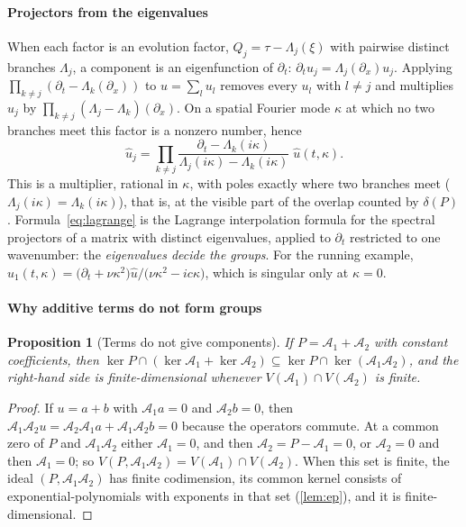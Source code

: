 \documentclass[11pt]{article}
\theoremstyle{plain}
\newtheorem{proposition}[theorem]{Proposition}
\theoremstyle{definition}
\theoremstyle{remark}
\newcommand{\Var}{V}                        %
\newcommand{\deltaP}{\delta(P)}             %
\begin{document}
\paragraph{Projectors from the eigenvalues}
When each factor is an evolution factor, $Q_j=\tau-\Lambda_j(\xi)$ with pairwise distinct branches
$\Lambda_j$, a component is an eigenfunction of $\partial_t$: $\partial_tu_j=\Lambda_j(\partial_x)u_j$. Applying
$\prod_{k\ne j}(\partial_t-\Lambda_k(\partial_x))$ to $u=\sum_lu_l$ removes every $u_l$ with $l\ne j$ and multiplies $u_j$ by $\prod_{k\ne j}(\Lambda_j-\Lambda_k)(\partial_x)$.
On a spatial Fourier mode $\kappa$ at which no two branches meet this factor is a nonzero number, hence
\begin{equation}\label{eq:lagrange}
  \hat u_j=\prod_{k\ne j}\frac{\partial_t-\Lambda_k(i\kappa)}{\Lambda_j(i\kappa)-\Lambda_k(i\kappa)}\;\hat u(t,\kappa) .
\end{equation}
This is a multiplier, rational in $\kappa$, with poles exactly where two branches
meet ($\Lambda_j(i\kappa)=\Lambda_k(i\kappa)$), that is, at the visible part of the overlap counted by $\deltaP$.
Formula~\eqref{eq:lagrange} is the Lagrange interpolation formula for the spectral projectors of a
matrix with distinct eigenvalues, applied to $\partial_t$ restricted to one wavenumber: the
\emph{eigenvalues decide the groups}. For the running example,
$\hat u_1(t,\kappa)=\big(\partial_t+\nu\kappa^2\big)\hat u/\big(\nu\kappa^2-ic\kappa\big)$, which is
singular only at $\kappa=0$.

\paragraph{Why additive terms do not form groups}
\begin{proposition}[Terms do not give components]\label{prop:terms}
If $P=\mathcal A_1+\mathcal A_2$ with constant coefficients, then
$\ker P\cap(\ker \mathcal A_1+\ker \mathcal A_2)\subseteq\ker P\cap\ker(\mathcal A_1\mathcal A_2)$, and the right-hand side is
finite-dimensional whenever $\Var(\mathcal A_1)\cap\Var(\mathcal A_2)$ is finite.
\end{proposition}

\begin{proof}
If $u=a+b$ with $\mathcal A_1a=0$ and $\mathcal A_2b=0$, then $\mathcal A_1\mathcal A_2u=\mathcal A_2\mathcal A_1a+\mathcal A_1\mathcal A_2b=0$ because the operators commute.
At a common zero of $P$ and $\mathcal A_1\mathcal A_2$ either $\mathcal A_1=0$, and then $\mathcal A_2=P-\mathcal A_1=0$, or $\mathcal A_2=0$ and then
$\mathcal A_1=0$; so $\Var(P,\mathcal A_1\mathcal A_2)=\Var(\mathcal A_1)\cap\Var(\mathcal A_2)$. When this set is finite, the ideal $(P,\mathcal A_1\mathcal A_2)$
has finite codimension, its common kernel consists of exponential-polynomials with exponents in that
set (\cref{lem:ep}), and it is finite-dimensional.
\end{proof}
\end{document}
